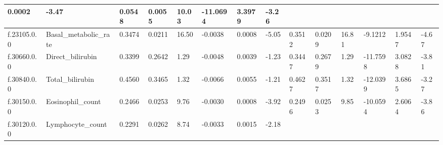 \begin{longtable}{llllllllllllll}
  \multicolumn{1}{l|}{0.0002} &
  \multicolumn{1}{l|}{-3.47} &
  \multicolumn{1}{l|}{0.0548} &
  \multicolumn{1}{l|}{0.0055} &
  \multicolumn{1}{l|}{10.03} &
  \multicolumn{1}{l|}{-11.0694} &
  \multicolumn{1}{l|}{3.3979} &
  \multicolumn{1}{l|}{-3.26} \\ \hline
\multicolumn{1}{|l|}{f.23105.0.0} &
  \multicolumn{1}{l|}{Basal\_metabolic\_rate} &
  \multicolumn{1}{l|}{0.3474} &
  \multicolumn{1}{l|}{0.0211} &
  \multicolumn{1}{l|}{16.50} &
  \multicolumn{1}{l|}{-0.0038} &
  \multicolumn{1}{l|}{0.0008} &
  \multicolumn{1}{l|}{-5.05} &
  \multicolumn{1}{l|}{0.3512} &
  \multicolumn{1}{l|}{0.0209} &
  \multicolumn{1}{l|}{16.81} &
  \multicolumn{1}{l|}{-9.1212} &
  \multicolumn{1}{l|}{1.9547} &
  \multicolumn{1}{l|}{-4.67} \\ \hline
\multicolumn{1}{|l|}{f.30660.0.0} &
  \multicolumn{1}{l|}{Direct\_bilirubin} &
  \multicolumn{1}{l|}{0.3399} &
  \multicolumn{1}{l|}{0.2642} &
  \multicolumn{1}{l|}{1.29} &
  \multicolumn{1}{l|}{-0.0048} &
  \multicolumn{1}{l|}{0.0039} &
  \multicolumn{1}{l|}{-1.23} &
  \multicolumn{1}{l|}{0.3447} &
  \multicolumn{1}{l|}{0.2679} &
  \multicolumn{1}{l|}{1.29} &
  \multicolumn{1}{l|}{-11.7598} &
  \multicolumn{1}{l|}{3.0828} &
  \multicolumn{1}{l|}{-3.81} \\ \hline
\multicolumn{1}{|l|}{f.30840.0.0} &
  \multicolumn{1}{l|}{Total\_bilirubin} &
  \multicolumn{1}{l|}{0.4560} &
  \multicolumn{1}{l|}{0.3465} &
  \multicolumn{1}{l|}{1.32} &
  \multicolumn{1}{l|}{-0.0066} &
  \multicolumn{1}{l|}{0.0055} &
  \multicolumn{1}{l|}{-1.21} &
  \multicolumn{1}{l|}{0.4627} &
  \multicolumn{1}{l|}{0.3517} &
  \multicolumn{1}{l|}{1.32} &
  \multicolumn{1}{l|}{-12.0399} &
  \multicolumn{1}{l|}{3.6865} &
  \multicolumn{1}{l|}{-3.27} \\ \hline
\multicolumn{1}{|l|}{f.30150.0.0} &
  \multicolumn{1}{l|}{Eosinophil\_count} &
  \multicolumn{1}{l|}{0.2466} &
  \multicolumn{1}{l|}{0.0253} &
  \multicolumn{1}{l|}{9.76} &
  \multicolumn{1}{l|}{-0.0030} &
  \multicolumn{1}{l|}{0.0008} &
  \multicolumn{1}{l|}{-3.92} &
  \multicolumn{1}{l|}{0.2496} &
  \multicolumn{1}{l|}{0.0253} &
  \multicolumn{1}{l|}{9.85} &
  \multicolumn{1}{l|}{-10.0594} &
  \multicolumn{1}{l|}{2.6064} &
  \multicolumn{1}{l|}{-3.86} \\ \hline
\multicolumn{1}{|l|}{f.30120.0.0} &
  \multicolumn{1}{l|}{Lymphocyte\_count} &
  \multicolumn{1}{l|}{0.2291} &
  \multicolumn{1}{l|}{0.0262} &
  \multicolumn{1}{l|}{8.74} &
  \multicolumn{1}{l|}{-0.0033} &
  \multicolumn{1}{l|}{0.0015} &
  \multicolumn{1}{l|}{-2.18} &

\end{longtable}
